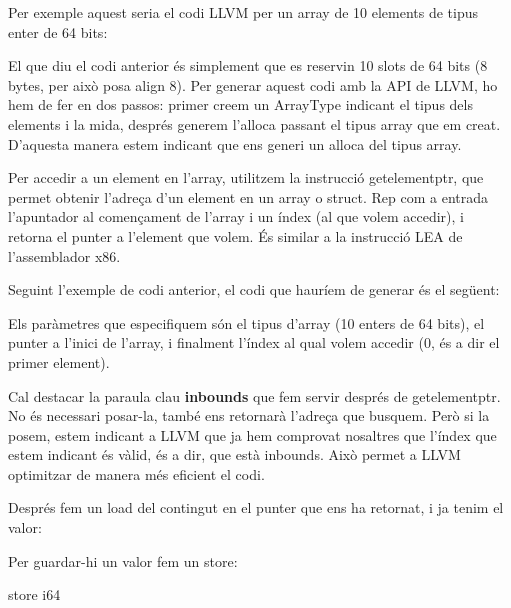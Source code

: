 ﻿\documentclass{article}
\begin{document}
Per exemple aquest seria el codi LLVM per un array de 10 elements de tipus 
enter de 64 bits:

\begin{code}
\end{code}

El que diu el codi anterior és simplement que es reservin 10 slots de 64 bits 
(8 bytes, per això posa align 8). Per generar aquest codi amb la API de LLVM,
ho hem de fer en dos passos: primer creem un ArrayType indicant el tipus dels
elements i la mida, després generem l'alloca passant el tipus array que em creat.
D'aquesta manera estem indicant que ens generi un alloca del tipus array.

Per accedir a un element en l'array, utilitzem la instrucció getelementptr, que
permet obtenir l'adreça d'un element en un array o struct. Rep com a entrada
l'apuntador al començament de l'array i un índex (al que volem accedir), i
retorna el punter a l'element que volem. És similar a la instrucció
LEA \cite{lea} de l'assemblador
x86.

Seguint l'exemple de codi anterior, el codi que hauríem de generar és el següent:

\begin{code}
\end{code}

Els paràmetres que especifiquem són el tipus d'array (10 enters de 64 bits), el
punter a l'inici de l'array, i finalment l'índex al qual volem accedir (0, és a
dir el primer element).

Cal destacar la paraula clau \textbf{inbounds} que fem servir després de
getelementptr. No és necessari posar-la, també ens retornarà l'adreça que
busquem. Però si  la posem, estem indicant a LLVM que ja hem comprovat nosaltres
que l'índex que estem indicant és vàlid, és a dir, que està inbounds. Això
permet a LLVM optimitzar de manera més eficient el codi.

Després fem un load del contingut en el punter que ens ha retornat, i ja tenim
el valor:

\begin{code}
\end{code}

Per guardar-hi un valor fem un store:

\begin{code}
store i64 %
\end{code}
\end{document}
